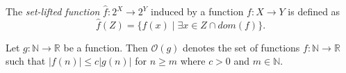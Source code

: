 \begin{definition}
  The \emph{set-lifted function} $\hat{f} : 2^X \rightarrow 2^Y$ induced by a
  function $f: X \rightarrow Y$ is defined as
  \begin{equation*}
    \hat{f}(Z) = \{ f(x) \mid \exists x \in Z \cap dom(f) \}.
  \end{equation*}
\end{definition}

\begin{definition}
  Let $g : \mathbb{N} \rightarrow \mathbb{R}$ be a function. Then $\mathcal{O}(g)$
  denotes the set of functions $f: \mathbb{N} \rightarrow \mathbb{R}$ such that
  $|f(n)| \leq c|g(n)|$ for $n \geq m$ where $c > 0$ and $m \in \mathbb{N}$.
\end{definition}
